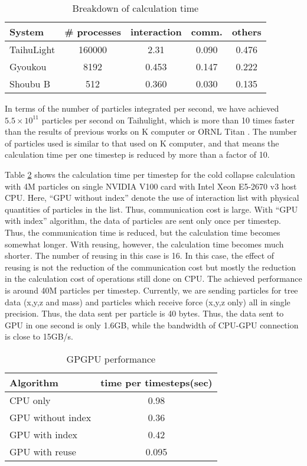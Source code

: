 \begin{table}
\centering
  \caption{Breakdown of calculation time}
  \label{tab:time}
  \begin{tabular}{lcccc}
    \hline
 System  & \# processes & interaction & comm. & others\\
    \hline  
TaihuLight&160000 &  2.31& 0.090& 0.476\\
Gyoukou&8192   & 0.453& 0.147&     0.222\\
Shoubu B         &512& 0.360& 0.030&     0.135\\
\hline
\end{tabular}
\end{table}




In terms of the number of particles integrated per second, we have
achieved $5.5\times 10^{11}$ particles per second on Taihulight, which
is more than 10 times faster than the results of previous works on K
computer\cite{Ishiyamaetal2012} or ORNL Titan
\cite{Bedorfetal2014}. The number of particles used is similar to that
used on K computer\cite{Ishiyamaetal2012}, and that means the
calculation time per one timestep is reduced by more than a factor of
10. 

Table \ref{tab:gpgputime} shows the calculation time per timestep for
the cold collapse calculation with 4M particles on single NVIDIA V100
card with Intel Xeon E5-2670 v3 host CPU. Here, ``GPU without index''
denote the use of interaction list with physical quantities of
particles in the list. Thus, communication cost is large. 
With ``GPU with index'' algorithm, the data of particles are sent only
once per timestep. Thus, the communication time is reduced, but the
calculation time becomes somewhat longer. With reusing, however, the
calculation time becomes much shorter. The number of reusing in this
case is 16. In this case, the effect of reusing is not the reduction
of the communication cost but mostly the reduction in the calculation
cost of operations still done on CPU. The achieved performance is
around 40M particles per timestep. Currently, we are sending particles
for tree data (x,y,z and mass) and particles which receive force
(x,y,z only) all in single precision. Thus, the data sent per particle
is 40 bytes. Thus, the data sent to GPU in one second is only 1.6GB,
while the bandwidth of CPU-GPU connection is close to 15GB/s.




\begin{table}
\centering
  \caption{GPGPU performance}
  \label{tab:gpgputime}
  \begin{tabular}{lc}
    \hline
Algorithm  & time per timesteps(sec)\\
\hline
CPU only & 0.98\\
GPU without index & 0.36\\
GPU with index & 0.42\\
GPU with reuse & 0.095\\
\hline
\end{tabular}
\end{table}


